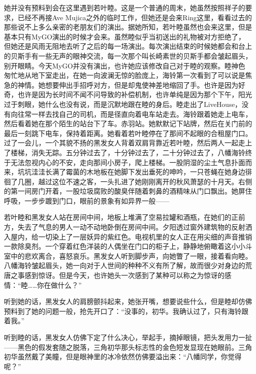 \documentclass{article}
\begin{document}
她并没有预料到会在这里遇到若叶睦。这是一个普通的周末，她虽然按照祥子的要求，已经不再接Ave Mujica之外的临时工作，但她还是会来Ring这里，看看过去的那些说不上多么亲密的老朋友们的演出。据她所知，若叶睦虽然也会来这里，但是基本只有MyGO演出的时候才会来。虽然睦似乎当初送出的礼物被对方拒绝了，但她还是风雨无阻地去听了之后的每一场演出。每次演出结束的时候她都会和台上的贝斯手有一些无声的眼神交流，每一次那个叫长崎素世的贝斯手都会皱起眉头，别开眼睛。今天MyGO并没有演出，也许她应该修改自己对于睦的观察。睦神色匆忙地从地下室走出，在她一向波澜无惊的脸庞上，海铃第一次看到了可以说是焦急的神情。她想要伸出手招呼对方，但是却鬼使神差地缩回了手。也许是因为好奇，也许是因为长时间不闻不问导致的补偿机制，也许单纯是因为那个下午，阳光过于刺眼，她什么也没有说，而是沉默地跟在睦的身后。睦走出了LiveHouse，没有向往常一样去找自己的司机，而是径直向着电车站走去。海铃跟着她走上电车，然后看着她在那个陌生的站台下了车。赤羽站。她默默记下站牌，然后在关门前的最后一刻跳下电车，保持着距离。她看着若叶睦停在了那间不起眼的合租屋门口。过了一会儿，一个其貌不扬的黑发女人背着双肩背靠近若叶睦，然后两人一起走上了楼梯，消失无踪。五分钟过去了，十分钟过去了，二十分钟过去了，八幡海铃终于无法忽视内心的不安，走向那间小房子，爬上楼梯。一股阴湿的尘土气息扑面而来，坑坑洼洼长满了霉菌的木地板在她脚下发出垂死的呻吟，一只苍蝇在她身边徘徊了几圈，越过这位不速之客，一头扎进了她刚刚离开的秋风萧瑟的十月天。右侧的第一间房门开着，一股垃圾腐败的酸臭伴随着刺鼻的酒精味从门口飘出。她屏住呼吸，一步步踱到门口，眼前的景象有如异界一般——



若叶睦和黑发女人站在房间中间，地板上堆满了空易拉罐和酒瓶，在她们的正前方，失去了气息的男人一动不动地卧倒在房间中间。夕阳透过窗外建筑物的反射洒入屋内，给一切染上了一层妖异的紫红色。电视机里的女人正在用尖细的声音推销一款除臭剂。一个穿着红色洋装的人偶坐在门口的柜子上，静静地俯瞰着这小小斗室中的悲欢离合，喜怒哀乐。黑发女人听到脚步声，向她瞥了一眼，接着看向睦。八幡海铃皱起眉头，她一向对于人世间的种种不义有所了解，故而很少对身边的荒唐之事感到惊讶。但是今天，也许她头一次感到了某种可以称之为惊讶的感情：“睦……你在做什么？”



听到她的话，黑发女人的肩膀颤抖起来，她张开嘴，想要说些什么，但是睦却仿佛预料到了她的问题一般，抢先开口了：“没事的，初华。我确认过了，只有海铃跟着我。”



听到睦的话，黑发女人仿佛下定了什么决心，举起手，摘掉眼镜，把头发用力一扯——黑色的假发套随之脱落，三角初华那头标志性的金色短发显现在她眼前。三角初华虽然戴了美瞳，但是眼神里的冰冷依然仿佛要溢出来：“八幡同学，你觉得呢？”
\end{document}
